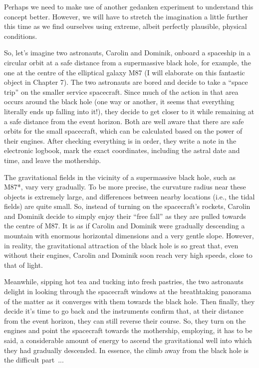 Perhaps we need to make use of another gedanken experiment to understand this concept
better. However, we will have to stretch the imagination a little further this time as
we find ourselves using extreme, albeit perfectly plausible, physical conditions.

So, let's imagine two astronauts, Carolin and Dominik, onboard a spaceship in a circular
orbit at a safe distance from a supermassive black hole, for example,
the one at the centre of the elliptical galaxy M87 (I will elaborate
on this fantastic object in Chapter 7). The two astronauts are bored and decide to take
a ``space trip'' on the smaller service spacecraft. Since much of the action in that
area occurs around the black hole (one way or another, it seems that everything
literally ends up falling into it!), they decide to get closer to it while remaining at
a safe distance from the event horizon. Both are well aware that there are safe orbits
for the small spacecraft, which can be calculated based on the power of their engines.
After checking everything is in order, they write a note in the electronic logbook, mark
the exact coordinates, including the astral date and time, and leave
the mothership.

The gravitational fields in the vicinity of a supermassive black hole,
such as M87*, vary very gradually. To be more precise, the curvature
radius near these objects is extremely large, and differences between nearby locations
(i.e., the tidal fields) are quite small. So, instead of turning on the spacecraft's
rockets, Carolin and Dominik decide to simply enjoy their ``free
fall'' as they are pulled towards the centre of M87. It is as if
Carolin and Dominik were gradually descending a mountain with enormous horizontal
dimensions and a very gentle slope. However, in reality, the gravitational attraction of
the black hole is so great that, even without their engines, Carolin and Dominik soon
reach very high speeds, close to that of light.

Meanwhile, sipping hot tea and tucking into fresh pastries, the two astronauts delight
in looking through the spacecraft windows at the breathtaking panorama of the matter as
it converges with them towards the black hole. Then finally, they decide it's time to go
back and the instruments confirm that, at their distance from the event horizon, they
can still reverse their course. So, they turn on the engines and point the spacecraft
towards the mothership, employing, it has to be said, a considerable amount of energy to
ascend the gravitational well into which they had gradually descended. In essence, the
climb away from the black hole is the difficult part~...

